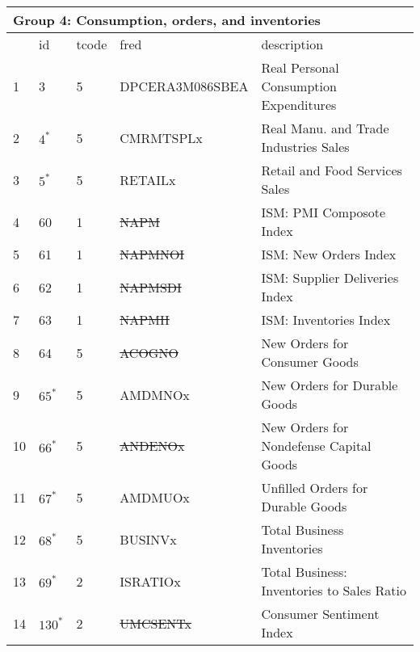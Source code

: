 \begin{table}[ht] 
\centering 
\begin{tabular}{lllll}
\multicolumn{5}{l}{Group 4: Consumption, orders, and inventories} \\
\toprule
 & id & tcode & fred & description \\
\midrule
1 & 3 & 5 & DPCERA3M086SBEA & Real Personal Consumption Expenditures \\
2 & $4^*$ & 5 & CMRMTSPLx & Real Manu. and Trade Industries Sales \\
3 & $5^*$ & 5 & RETAILx & Retail and Food Services Sales \\
4 & 60 & 1 & \sout{NAPM} & ISM: PMI Composote Index \\
5 & 61 & 1 & \sout{NAPMNOI} & ISM: New Orders Index \\
6 & 62 & 1 & \sout{NAPMSDI} & ISM: Supplier Deliveries Index \\
7 & 63 & 1 & \sout{NAPMII} & ISM: Inventories Index \\
8 & 64 & 5 & \sout{ACOGNO} & New Orders for Consumer Goods \\
9 & $65^*$ & 5 & AMDMNOx & New Orders for Durable Goods \\
10 & $66^*$ & 5 & \sout{ANDENOx} & New Orders for Nondefense Capital Goods \\
11 & $67^*$ & 5 & AMDMUOx & Unfilled Orders for Durable Goods \\
12 & $68^*$ & 5 & BUSINVx & Total Business Inventories \\
13 & $69^*$ & 2 & ISRATIOx & Total Business: Inventories to Sales Ratio \\
14 & $130^*$ & 2 & \sout{UMCSENTx} & Consumer Sentiment Index \\
\bottomrule
\end{tabular}  
\end{table} 